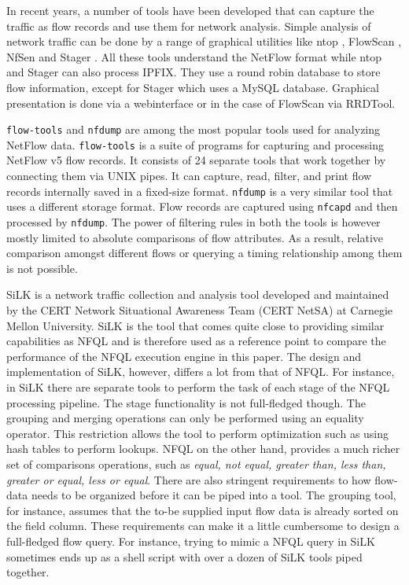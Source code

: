 In recent years, a number of tools have been developed that can capture the
traffic as flow records and use them for network analysis. Simple analysis of
network traffic can be done by a range of graphical utilities like ntop
\cite{ntop:2000}, FlowScan \cite{flowscan:2000}, NfSen \cite{phaag:2006} and
Stager \cite{oslebo:2006}. All these tools understand the NetFlow format while
ntop and Stager can also process \ac{IPFIX}. They use a round robin database
to store flow information, except for Stager which uses a MySQL database.
Graphical presentation is done via a webinterface or in the case of FlowScan
via RRDTool.

\texttt{flow-tools} and \texttt{nfdump} are among the most popular tools used
for analyzing NetFlow data. \texttt{flow-tools} \cite{sromig:2000} is a suite
of programs for capturing and processing NetFlow v5 flow records. It consists
of 24 separate tools that work together by connecting them via UNIX pipes. It
can capture, read, filter, and print flow records internally saved in a
fixed-size format. \texttt{nfdump} \cite{phaag:2006} is a very similar tool
that uses a different storage format. Flow records are captured using
\texttt{nfcapd} and then processed by \texttt{nfdump}. The power of filtering
rules in both the tools is however mostly limited to absolute comparisons of
flow attributes. As a result, relative comparison amongst different flows or
querying a timing relationship among them is not possible.


SiLK \cite{SiLK} is a network traffic collection and analysis tool developed
and maintained by the CERT Network Situational Awareness Team (CERT NetSA) at
Carnegie Mellon University.  SiLK is the tool that comes quite close to
providing similar capabilities as \ac{NFQL} and is therefore used as a
reference point to compare the performance of the \ac{NFQL} execution engine
in this paper. The design and implementation of SiLK, however, differs a lot
from that of \ac{NFQL}. For instance, in SiLK there are separate tools to
perform the task of each stage of the \ac{NFQL} processing pipeline. The stage
functionality is not full-fledged though. The grouping and merging operations
can only be performed using an equality operator. This restriction allows the
tool to perform optimization such as using hash tables to perform lookups.
\ac{NFQL} on the other hand, provides a much richer set of comparisons
operations, such as \emph{equal, not equal, greater than, less than, greater
or equal, less or equal}. There are also stringent requirements to how
flow-data needs to be organized before it can be piped into a tool. The
grouping tool, for instance, assumes that the to-be supplied input flow data
is already sorted on the field column.  These requirements can make it a
little cumbersome to design a full-fledged flow query.  For instance, trying
to mimic a \ac{NFQL} query in SiLK sometimes ends up as a shell script with
over a dozen of SiLK tools piped together.
